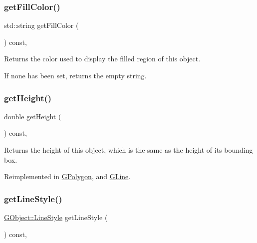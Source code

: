 \subsubsection{\texorpdfstring{get\+Fill\+Color()}{getFillColor()}}
{\footnotesize\ttfamily std\+::string get\+Fill\+Color (\begin{DoxyParamCaption}{ }\end{DoxyParamCaption}) const\hspace{0.3cm}{\ttfamily [virtual]}, {\ttfamily [inherited]}}



Returns the color used to display the filled region of this object. 

If none has been set, returns the empty string. \mbox{\label{classsgl_1_1GObject_a1e7e353362434072875264cf95629f99}} 
\subsubsection{\texorpdfstring{get\+Height()}{getHeight()}}
{\footnotesize\ttfamily double get\+Height (\begin{DoxyParamCaption}{ }\end{DoxyParamCaption}) const\hspace{0.3cm}{\ttfamily [virtual]}, {\ttfamily [inherited]}}



Returns the height of this object, which is the same as the height of its bounding box. 



Reimplemented in \mbox{\hyperlink{classsgl_1_1GPolygon_a2bede8b27b21ae4c7940e762cbad9e07}{G\+Polygon}}, and \mbox{\hyperlink{classsgl_1_1GLine_a2bede8b27b21ae4c7940e762cbad9e07}{G\+Line}}.

\mbox{\label{classsgl_1_1GObject_aaf1f5ea8281e5e3486662878d26f0a13}} 
\subsubsection{\texorpdfstring{get\+Line\+Style()}{getLineStyle()}}
{\footnotesize\ttfamily \mbox{\hyperlink{classsgl_1_1GObject_a86e0f5648542856159bb40775c854aa7}{G\+Object\+::\+Line\+Style}} get\+Line\+Style (\begin{DoxyParamCaption}{ }\end{DoxyParamCaption}) const\hspace{0.3cm}{\ttfamily [virtual]}, {\ttfamily [inherited]}}



